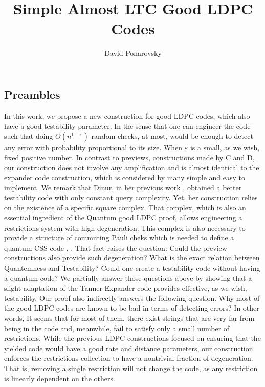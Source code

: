 \documentclass{article}
\begin{document}
\title{Simple Almost LTC Good LDPC Codes} 
\author{David Ponarovsky}
\maketitle
{} 
\begin{multicols*}{2}
  \section{Preambles}
  In this work, we propose a new construction for good LDPC codes, which also have a good testability parameter. In the sense that one can engineer the code such that doing $\Theta\left( n^{1-\varepsilon}\right)$ random checks, at most, would be enough to detect any error with probability proportional to its size. When $\varepsilon$ is a small, as we wish, fixed positive number. In contrast to previews, constructions made by C and D, our construction does not involve any amplification and is almost identical to the expander code construction, which is considered by many simple and easy to implement. We remark that Dinur, in her previous work \cite{Dinur}, obtained a better testability code with only constant query complexity. 
  Yet, her construction relies on the existence of a specific square complex. That complex, which is also an essential ingredient of the Quantum good LDPC proof, allows engineering a restrictions system with high degeneration. This complex is also necessary to provide a structure of commuting Pauli cheks which is needed to define a quantum CSS code \cite{Pavel}, \cite{leverrier2022quantum}. That fact raises the question: Could the preview constructions also provide such degeneration? What is the exact relation between Quantemness and Testability? Could one create a testability code without having a quantum code? We partially answer those questions above by showing that a slight adaptation of the Tanner-Expander code provides effective, as we wish, testability.
  Our proof also indirectly answers the following question. Why most of the good LDPC codes are known to be bad in terms of detecting errors? In other words, It seems that for most of them, there exist strings that are very far from being in the code and, meanwhile, fail to satisfy only a small number of restrictions.
  While the previous LDPC constructions focused on ensuring that the yielded code would have a good rate and distance parameters, our construction enforces the restrictions collection to have a nontrivial fraction of degeneration. That is, removing a single restriction will not change the code, as any restriction is linearly dependent on the others.




\end{multicols*}
\end{document}
